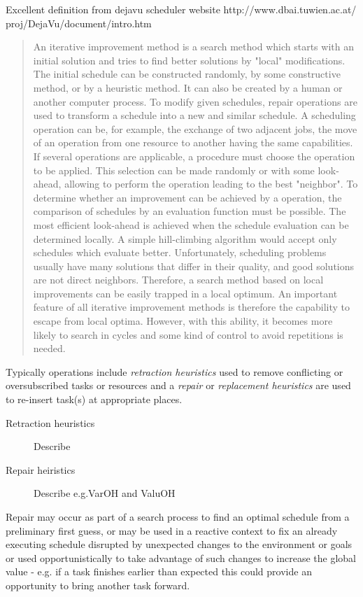 Excellent definition from dejavu scheduler website http://www.dbai.tuwien.ac.at/ proj/DejaVu/document/intro.htm
\begin{quote}
An iterative improvement method is a search method which starts with an initial solution and tries to find better solutions by "local" modifications. The initial schedule can be constructed randomly, by some constructive method, or by a heuristic method. It can also be created by a human or another computer process. To modify given schedules, repair operations are used to transform a schedule into a new and similar schedule. A scheduling operation can be, for example, the exchange of two adjacent jobs, the move of an operation from one resource to another having the same capabilities. If several operations are applicable, a procedure must choose the operation to be applied. This selection can be made randomly or with some look-ahead, allowing to perform the operation leading to the best "neighbor". To determine whether an improvement can be achieved by a operation, the comparison of schedules by an evaluation function must be possible. The most efficient look-ahead is achieved when the schedule evaluation can be determined locally.
A simple hill-climbing algorithm would accept only schedules which evaluate better. Unfortunately, scheduling problems usually have many solutions that differ in their quality, and good solutions are not direct neighbors. Therefore, a search method based on local improvements can be easily trapped in a local optimum. An important feature of all iterative improvement methods is therefore the capability to escape from local optima. However, with this ability, it becomes more likely to search in cycles and some kind of control to avoid repetitions is needed. 
\end{quote}


 Typically operations include \emph{retraction heuristics} used to remove conflicting or oversubscribed tasks or resources and a \emph{repair} or \emph{replacement heuristics} are used to re-insert task(s) at appropriate places. 

\begin{description}
\item[Retraction heuristics] Describe
\item[Repair heiristics] Describe e.g.VarOH and ValuOH
\end{description}

Repair may occur as part of a search process to find an optimal schedule from a preliminary first guess, or may be used in a reactive context to fix an already executing schedule disrupted by unexpected changes to the environment or goals or used opportunistically to take advantage of such changes to increase the global value - e.g. if a task finishes earlier than expected this could provide an opportunity to bring another task forward.

